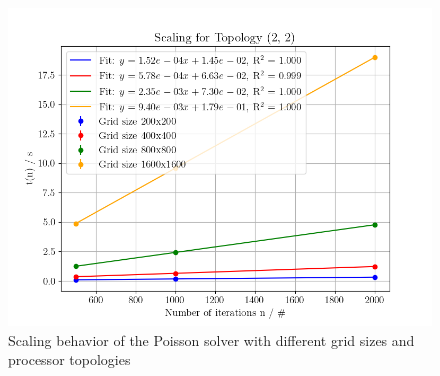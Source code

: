 \begin{figure}[H]
    \begin{minipage}{0.48\textwidth}
        \centering
        \includegraphics[width=\linewidth]{../fig/lab1/scaling_topology_2x2.png}
    \end{minipage}
    
    \caption{Scaling behavior of the Poisson solver with different grid sizes and processor topologies}
    \label{fig:scaling_123}
\end{figure}

